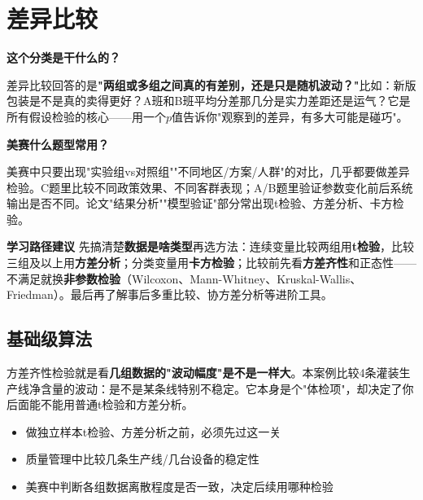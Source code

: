 \chapter{差异比较}

\begin{chapteroverview}
\textbf{这个分类是干什么的？}

差异比较回答的是\textbf{"两组或多组之间真的有差别，还是只是随机波动？"}比如：新版包装是不是真的卖得更好？A班和B班平均分差那几分是实力差距还是运气？它是所有假设检验的核心——用一个$p$值告诉你"观察到的差异，有多大可能是碰巧"。

\textbf{美赛什么题型常用？}

美赛中只要出现"实验组vs对照组""不同地区/方案/人群"的对比，几乎都要做差异检验。C题里比较不同政策效果、不同客群表现；A/B题里验证参数变化前后系统输出是否不同。论文"结果分析""模型验证"部分常出现t检验、方差分析、卡方检验。

\textbf{学习路径建议}
先搞清楚\textbf{数据是啥类型}再选方法：连续变量比较两组用\textbf{t检验}，比较三组及以上用\textbf{方差分析}；分类变量用\textbf{卡方检验}；比较前先看\textbf{方差齐性}和正态性——不满足就换\textbf{非参数检验}（Wilcoxon、Mann-Whitney、Kruskal-Wallis、Friedman）。最后再了解事后多重比较、协方差分析等进阶工具。
\end{chapteroverview}

\section{基础级算法}


\begin{algointro}
方差齐性检验就是看\textbf{几组数据的"波动幅度"是不是一样大}。本案例比较4条灌装生产线净含量的波动：是不是某条线特别不稳定。它本身是个"体检项"，却决定了你后面能不能用普通t检验和方差分析。
\end{algointro}

\begin{algoscene}
\begin{itemize}
    \item 做独立样本t检验、方差分析之前，必须先过这一关
    \item 质量管理中比较几条生产线/几台设备的稳定性
    \item 美赛中判断各组数据离散程度是否一致，决定后续用哪种检验
\end{itemize}
\end{algoscene}

